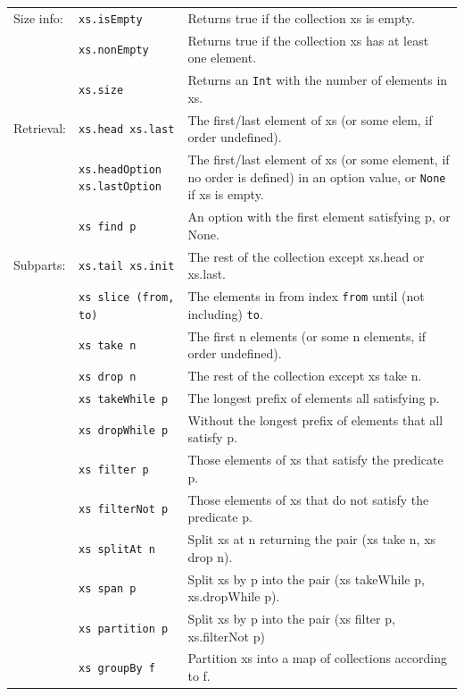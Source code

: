 \documentclass[article, a5paper]{memoir}
\begin{document}
{\begin{tabular}{@{}l p{3.5cm} p{6.8cm}}
  Size info: & \texttt{xs.isEmpty} & Returns true if the collection xs is empty.\\ \cline{2-3}
   & \texttt{xs.nonEmpty} & Returns true if the collection xs has at least one element.\\ \cline{2-3}
   & \texttt{xs.size} & Returns an \texttt{Int} with the number of elements in xs.\\ \cline{1-3}
   

  Retrieval: & \texttt{xs.head xs.last} &  	The first/last element of xs (or some elem, if order undefined).\\ \cline{2-3}
      & \texttt{xs.headOption \newline xs.lastOption} & The first/last element of xs (or some element, if no order is defined) in an option value, or \texttt{None} if xs is empty.\\ \cline{2-3}
      & \texttt{xs find p} & An option with the first element satisfying p, or None.\\ \cline{1-3}


  Subparts: & \texttt{xs.tail xs.init} & The rest of the collection except xs.head or xs.last.\\ \cline{2-3}
      & \texttt{xs slice (from, to)} & The elements in from index \texttt{from} until (not including) \texttt{to}.\\ \cline{2-3}
      & \texttt{xs take n} & The first n elements (or some n elements, if order undefined).\\ \cline{2-3}
      & \texttt{xs drop n} & The rest of the collection except xs take n.\\ \cline{2-3}
      & \texttt{xs takeWhile p} & The longest prefix of elements all satisfying p.\\ \cline{2-3}
      & \texttt{xs dropWhile p} & Without the longest prefix of elements that all satisfy p.\\ \cline{2-3}
      & \texttt{xs filter p} & Those elements of xs that satisfy the predicate p. \\ \cline{2-3}
      & \texttt{xs filterNot p} & Those elements of xs that do not satisfy the predicate p.\\ \cline{2-3}
      & \texttt{xs splitAt n} &  	Split xs at n returning the pair (xs take n, xs drop n).\\ \cline{2-3}
      & \texttt{xs span p} & Split xs by p into the pair (xs takeWhile p, xs.dropWhile p).\\ \cline{2-3}
      & \texttt{xs partition p} & Split xs by p into the pair (xs filter p, xs.filterNot p)\\ \cline{2-3}
      & \texttt{xs groupBy f} & Partition xs into a map of collections according to f.\\ \cline{1-3}



\end{tabular}}
\end{document}
